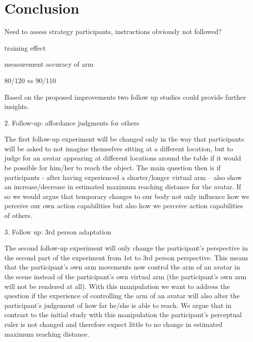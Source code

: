 \section{Conclusion}\label{conclusion}

Need to assess strategy participants, instructions obviously not followed?

training effect

measurement accuracy of arm

80/120 vs 90/110

Based on the proposed improvements two follow up studies could provide further insights.

2. Follow-up: affordance judgments for others

The first follow-up experiment will be changed only in the way that participants will be asked to not imagine themselves sitting at a different location, but to judge for an avatar appearing at different locations around the table if it would be possible for him/her to reach the object. 
The main question then is if participants - after having experienced a shorter/longer virtual arm – also show an increase/decrease in estimated maximum reaching distance for the avatar. If so we would argue that temporary changes to our body not only influence how we perceive our own action capabilities but also how we perceive action capabilities of others.

3. Follow up: 3rd person adaptation

The second follow-up experiment will only change the participant’s perspective in the second part of the experiment from 1st to 3rd person perspective. This means that the participant’s own arm movements now control the arm of an avatar in the scene instead of the participant’s own virtual arm (the participant’s own arm will not be rendered at all). 
With this manipulation we want to address the question if the experience of controlling the arm of an avatar will also alter the participant’s judgement of how far he/she is able to reach. We argue that in contrast to the initial study with this manipulation the participant’s perceptual ruler is not changed and therefore expect little to no change in estimated maximum reaching distance.